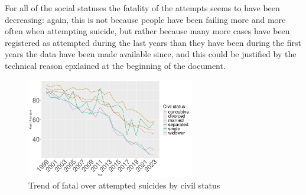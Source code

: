 \documentclass{article}
\begin{document}
For all of the social statuses the fatality of 
the attempts seems to have been decreasing: again,
this is not because people have been failing more and more often when attempting suicide, 
but rather because many more cases have been registered as attempted during the last years
than they have been during the first years the data have been made available since,
and this could be justified by the technical reason epxlained at the beginning of the document.
\begin{figure}[H]
    \centering
    \includegraphics[width=0.65\textwidth]{imgs/status_foa.pdf}
    \caption{Trend of fatal over attempted suicides by civil status }
	\label{fig:status_foa}
\end{figure}
\end{document}
